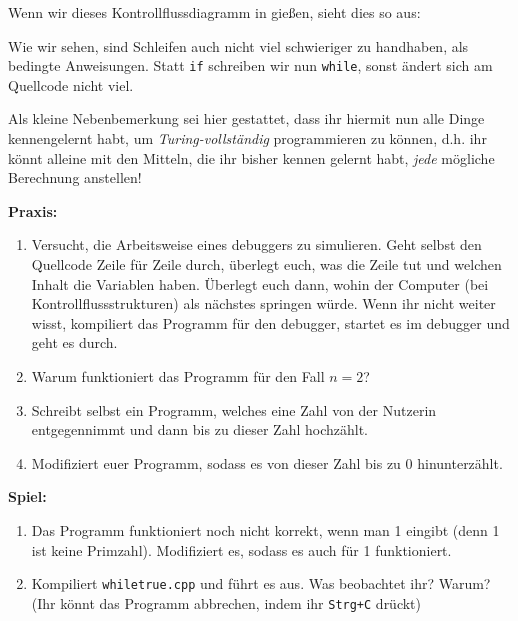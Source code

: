 Wenn wir dieses Kontrollflussdiagramm in \Cpp gießen, sieht dies so aus:

Wie wir sehen, sind Schleifen auch nicht viel schwieriger zu handhaben, als
bedingte Anweisungen. Statt \texttt{if} schreiben wir nun \texttt{while}, sonst
ändert sich am Quellcode nicht viel.

Als kleine Nebenbemerkung sei hier gestattet, dass ihr hiermit nun alle Dinge
kennengelernt habt, um \emph{Turing-vollständig} programmieren zu können, d.h.
ihr könnt alleine mit den Mitteln, die ihr bisher kennen gelernt habt,
\emph{jede} mögliche Berechnung anstellen!

\textbf{Praxis:}
\begin{enumerate}
    \item Versucht, die Arbeitsweise eines debuggers zu simulieren. Geht selbst
        den Quellcode Zeile für Zeile durch, überlegt euch, was die Zeile tut
        und welchen Inhalt die Variablen haben. Überlegt euch dann, wohin der
        Computer (bei Kontrollflussstrukturen) als nächstes springen würde.
        Wenn ihr nicht weiter wisst, kompiliert das Programm für den debugger,
        startet es im debugger und geht es durch.
    \item Warum funktioniert das Programm für den Fall $n = 2$?
    \item Schreibt selbst ein Programm, welches eine Zahl von der Nutzerin
        entgegennimmt und dann bis zu dieser Zahl hochzählt.
    \item Modifiziert euer Programm, sodass es von dieser Zahl bis zu 0
        hinunterzählt.
\end{enumerate}

\textbf{Spiel:}
\begin{enumerate}
    \item Das Programm funktioniert noch nicht korrekt, wenn man 1 eingibt
        (denn 1 ist keine Primzahl). Modifiziert es, sodass es auch für 1
        funktioniert.
    \item Kompiliert \texttt{whiletrue.cpp} und führt es aus. Was beobachtet
        ihr? Warum? (Ihr könnt das Programm abbrechen, indem ihr
        \texttt{Strg+C} drückt)
\end{enumerate}


